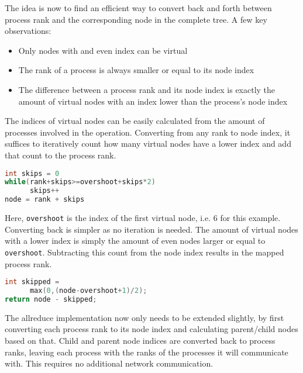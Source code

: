 \documentclass[twoside,twocolumn,hidelinks]{article}
\begin{document}
The idea is now to find an efficient way to convert back and forth between process rank and the corresponding node in the complete tree. A few key observations:
\begin{itemize}
      \item Only nodes with and even index can be virtual
      \item The rank of a process is always smaller or equal to its node index
      \item The difference between a process rank and its node index is exactly the amount of virtual nodes with an index lower than the process's node index
\end{itemize}

The indices of virtual nodes can be easily calculated from the amount of processes involved in the operation. Converting from any rank to node index, it suffices to iteratively count how many virtual nodes have a lower index and add that count to the process rank.
\begin{lstlisting}[language=C++,caption=Converting rank to node index,captionpos=b]
int skips = 0
while(rank+skips>=overshoot+skips*2)
      skips++
node = rank + skips
\end{lstlisting}

Here, \texttt{overshoot} is the index of the first virtual node, i.e. 6 for this example.
Converting back is simpler as no iteration is needed. The amount of virtual nodes with a lower index is simply the amount of even nodes larger or equal to \texttt{overshoot}. Subtracting this count from the node index results in the mapped process rank. \\

\begin{lstlisting}[language=C++,caption=Converting node index to rank,captionpos=b]
int skipped = 
      max(0,(node-overshoot+1)/2);
return node - skipped;
\end{lstlisting}

The allreduce implementation now only needs to be extended slightly, by first converting each process rank to its node index and calculating parent/child nodes based on that. Child and parent node indices are converted back to process ranks, leaving each process with the ranks of the processes it will communicate with. This requires no additional network communication.
\end{document}
